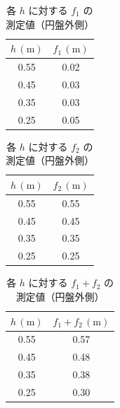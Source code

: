 \documentclass{jlreq}
\begin{document}
\begin{table}[htbp]
  \centering
  \caption{各 $h$ に対する $f_1$ の測定値（円盤外側）}
  \renewcommand{\arraystretch}{1.2} %
  \setlength{\tabcolsep}{6pt}       %
  \begin{tabular}{|c|c|}
    \hline
    \textbf{$h\,(\mathrm{m})$} & \textbf{$f_1\,(\mathrm{m})$} \\ \hline
    0.55 & 0.02 \\ \hline
    0.45 & 0.03 \\ \hline
    0.35 & 0.03 \\ \hline
    0.25 & 0.05 \\ \hline
  \end{tabular}
  \label{tab:disk_outer_f1}
\end{table}





\begin{table}[htbp]
  \centering
  \caption{各 $h$ に対する $f_2$ の測定値（円盤外側）}
  \renewcommand{\arraystretch}{1.2} %
  \setlength{\tabcolsep}{6pt}       %
  \begin{tabular}{|c|c|}
    \hline
    \textbf{$h\,(\mathrm{m})$} & \textbf{$f_2\,(\mathrm{m})$} \\ \hline
    0.55 & 0.55 \\ \hline
    0.45 & 0.45 \\ \hline
    0.35 & 0.35 \\ \hline
    0.25 & 0.25 \\ \hline
  \end{tabular}
  \label{tab:disk_outer_f2}
\end{table}




\begin{table}[htbp]
  \centering
  \caption{各 $h$ に対する $f_1 + f_2$ の測定値（円盤外側）}
  \renewcommand{\arraystretch}{1.2} %
  \setlength{\tabcolsep}{6pt}       %
  \begin{tabular}{|c|c|}
    \hline
    \textbf{$h\,(\mathrm{m})$} & \textbf{$f_1 + f_2\,(\mathrm{m})$} \\ \hline
    0.55 & 0.57 \\ \hline
    0.45 & 0.48 \\ \hline
    0.35 & 0.38 \\ \hline
    0.25 & 0.30 \\ \hline
  \end{tabular}
  \label{tab:disk_outer_f1f2}
\end{table}
\end{document}
